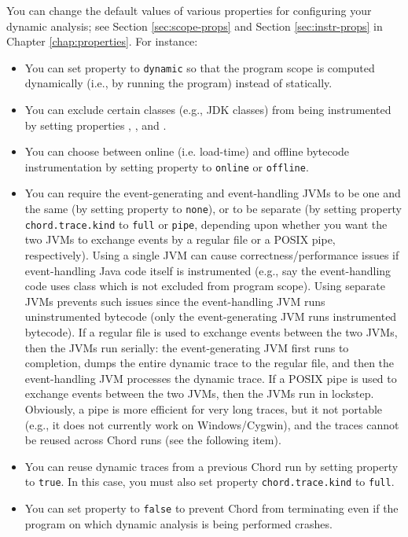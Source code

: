 You can change the default values of various properties for configuring your dynamic analysis;
see Section \ref{sec:scope-props} and Section \ref{sec:instr-props} in Chapter \ref{chap:properties}.
For instance:
\begin{itemize}
\item
You can set property  to {\tt dynamic} so that the program scope
is computed dynamically (i.e., by running the program) instead of statically.
\item
You can exclude certain classes (e.g., JDK classes) from being instrumented by setting
properties , , and
.
\item
You can choose between online (i.e. load-time) and offline bytecode instrumentation by
setting property  to {\tt online} or {\tt offline}.
\item
You can require the event-generating and event-handling JVMs to be one and the same (by setting
property  to {\tt none}),
or to be separate (by setting property {\tt chord.trace.kind} to {\tt full} or {\tt pipe}, depending upon
whether you want the two JVMs to exchange events by a regular file or a POSIX pipe, respectively).
Using a single JVM can cause correctness/performance issues if event-handling Java code itself is instrumented
(e.g., say the event-handling code uses class  which is not excluded from program scope).
Using separate JVMs prevents such issues since the event-handling JVM runs uninstrumented bytecode (only
the event-generating JVM runs instrumented bytecode).
If a regular file is used to exchange events between the two JVMs, then the JVMs run serially:
the event-generating JVM first runs to completion, dumps the entire dynamic trace to the regular file,
and then the event-handling JVM processes the dynamic trace.
If a POSIX pipe is used to exchange events between the two JVMs, then the JVMs run in lockstep.
Obviously, a pipe is more efficient for very long traces, but it 
not portable (e.g., it does not currently work on Windows/Cygwin), and the traces cannot be reused
across Chord runs (see the following item).
\item
You can reuse dynamic traces from a previous Chord run by setting property
 to {\tt true}.  In this case, you must also set property
{\tt chord.trace.kind} to {\tt full}.
\item
You can set property  to {\tt false} to prevent Chord from terminating
even if the program on which dynamic analysis is being performed crashes.
\end{itemize}

